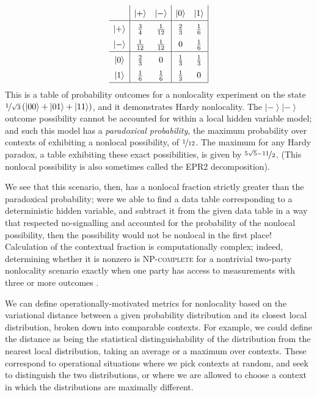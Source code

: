 \documentclass{amsart}
\theoremstyle{definition}
\newcommand{\ket}[1]{{\left\vert{#1}\right\rangle}}
\begin{document}
\begin{equation}\renewcommand{\arraystretch}{1.5}
\begin{array}{c| c c | c c |} \renewcommand{\arraystretch}{1.5}
&\ket{+}&\ket{-}&\ket{0}&\ket{1}\\\hline
\ket{+}&\frac{3}{4} &\frac{1}{12}  &\frac{2}{3} & \frac{1}{6}\\
\ket{-}&\frac{1}{12} &\frac{1}{12}  &0 &\frac{1}{6}\\ \hline
\ket{0}&\frac{2}{3}&0&\frac{1}{3} &\frac{1}{3} \\
\ket{1}&\frac{1}{6}&\frac{1}{6} &\frac{1}{3} &0 \\ \hline
\end{array} \renewcommand{\arraystretch}{1}
\end{equation}
This is a table of probability outcomes for a nonlocality experiment on the state $\nicefrac{1}{\sqrt{3}}\left(\ket{00}+\ket{01}+\ket{11}\right)$, and it demonstrates Hardy nonlocality. The $\ket{-}\ket{-}$ outcome possibility cannot be accounted for within a local hidden variable model; and such this model has a \emph{paradoxical probability}, the maximum probability over contexts of exhibiting a nonlocal possibility, of $\nicefrac{1}{12}$. The maximum for any Hardy paradox, a table exhibiting these exact possibilities, is given by $\nicefrac{5\sqrt{5}-11}{2}$. (This nonlocal possibility is also sometimes called the EPR2 decomposition).

We see that this scenario, then, has a nonlocal fraction strictly greater than the paradoxical probability; were we able to find a data table corresponding to a deterministic hidden variable, and subtract it from the given data table in a way that respected no-signalling and accounted for the probability of the nonlocal possibility, then the possibility would not be nonlocal in the first place!
Calculation of the contextual fraction is computationally complex; indeed, determining whether it is nonzero is \textsc{NP-complete} for a 
nontrivial two-party nonlocality scenario exactly when one party has access to measurements with three or more outcomes \cite{SimmCC}.

We can define operationally-motivated metrics for nonlocality based on the variational distance between a given probability distribution and its closest local distribution, broken down into comparable contexts. For example, we could define the distance as being the statistical distinguishability of the distribution from the nearest local distribution, taking an average or a maximum over contexts. These correspond to operational situations where we pick contexts at random, and seek to distinguish the two distributions, or where we are allowed to choose a context in which the distributions are maximally different.
\end{document}

